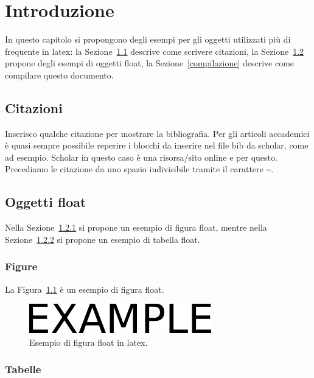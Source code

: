 \chapter{Introduzione}
\label{introduzione}

In questo capitolo si propongono degli esempi per gli oggetti utilizzati più di frequente in latex: la Sezione~\ref{citazioni} descrive come scrivere citazioni, la Sezione~\ref{oggetti-float} propone degli esempi di oggetti float, la Sezione~\ref{compilazione} descrive come compilare questo documento.

\section{Citazioni}
\label{citazioni}

Inserisco qualche citazione per mostrare la bibliografia. Per gli articoli accademici è quasi sempre possibile reperire i blocchi da inserire nel file bib da scholar, come ad esempio. Scholar in questo caso è una risorsa/sito online e per questo. Precediamo le citazione da uno spazio indivisibile tramite il carattere \textasciitilde.

\section{Oggetti float}
\label{oggetti-float}

Nella Sezione~\ref{figure-float} si propone un esempio di figura float, mentre nella Sezione~\ref{tabelle-float} si propone un esempio di tabella float.

\subsection{Figure}
\label{figure-float}

La Figura~\ref{fig:esempio} è un esempio di figura float.

\begin{figure}[htb]
    \centering
    \includegraphics[width=.4\columnwidth]{figures/example.pdf}
    \caption{Esempio di figura float in latex.}
\label{fig:esempio}
\end{figure}

\subsection{Tabelle}
\label{tabelle-float}


